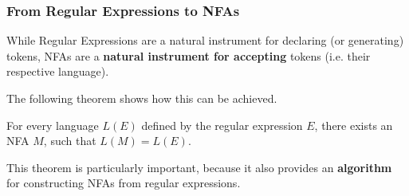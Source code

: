 \documentclass[a4paper, 12pt]{article}
\begin{document}
\subsubsection{ From Regular Expressions to NFAs }

While Regular Expressions are a natural instrument for declaring (or generating) tokens, NFAs are a \textbf{natural instrument for accepting} tokens (i.e. their respective language).

The following theorem shows how this can be achieved.


For every language $L(E)$ defined by the regular expression $E$, there exists an NFA $M$, such that $L(M)=L(E)$.


This theorem is particularly important, because it also provides an \textbf{algorithm} for constructing NFAs from regular expressions.
\end{document}
